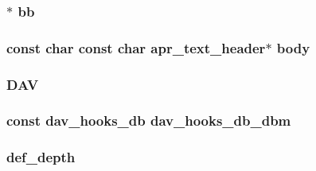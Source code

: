 \subsubsection[{\texorpdfstring{bb}{bb}}]{$\ast$ bb}\hypertarget{group__MOD__DAV_ga0b0eadb381dbe958da483f3d9fc9521a}{}\label{group__MOD__DAV_ga0b0eadb381dbe958da483f3d9fc9521a}
\subsubsection[{\texorpdfstring{body}{body}}]{\setlength{\rightskip}{0pt plus 5cm}const char const char {\bf apr\+\_\+text\+\_\+header}$\ast$ body}\hypertarget{group__MOD__DAV_gac4ba05af5940fc47e3b0aa0a79eb4bdc}{}\label{group__MOD__DAV_gac4ba05af5940fc47e3b0aa0a79eb4bdc}
\subsubsection[{\texorpdfstring{D\+AV}{DAV}}]{\setlength{\rightskip}{0pt plus 5cm}D\+AV}\hypertarget{group__MOD__DAV_gab3d9c9436d79e6e827e3d828f67f6053}{}\label{group__MOD__DAV_gab3d9c9436d79e6e827e3d828f67f6053}
\subsubsection[{\texorpdfstring{dav\+\_\+hooks\+\_\+db\+\_\+dbm}{dav_hooks_db_dbm}}]{\setlength{\rightskip}{0pt plus 5cm}const {\bf dav\+\_\+hooks\+\_\+db} dav\+\_\+hooks\+\_\+db\+\_\+dbm}\hypertarget{group__MOD__DAV_ga1bfcaf2d006fd752eca3dc211b22647b}{}\label{group__MOD__DAV_ga1bfcaf2d006fd752eca3dc211b22647b}
\subsubsection[{\texorpdfstring{def\+\_\+depth}{def_depth}}]{ def\+\_\+depth}\hypertarget{group__MOD__DAV_gacbd5af9ff1f1068fb0f530217a8f5b40}{}\label{group__MOD__DAV_gacbd5af9ff1f1068fb0f530217a8f5b40}
